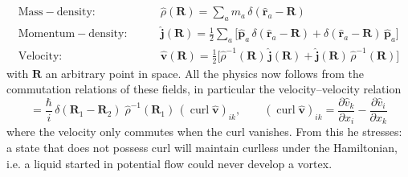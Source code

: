 \begin{equation}
\begin{aligned}
    \mathrm{Mass-density:} \qquad &\hat\rho(\mathbf R)=\sum_a m_a\,\delta(\hat{\mathbf r}_a-\mathbf R) \\
    \mathrm{Momentum-density:}\qquad &\hat{\mathbf j}(\mathbf R)=\frac{1}{2}\sum_a\big[\hat{\mathbf p}_a\,\delta(\hat{\mathbf r}_a-\mathbf R)+\delta(\hat{\mathbf r}_a-\mathbf R)\,\hat{\mathbf p}_a\big]\\
    \mathrm{Velocity:} \qquad &\hat{\mathbf v}(\mathbf R)=\frac{1}{2}\big[\hat\rho^{-1}(\mathbf R)\,\hat{\mathbf j}(\mathbf R)+\hat{\mathbf j}(\mathbf R)\,\hat\rho^{-1}(\mathbf R)\big]
\end{aligned}
\end{equation}
with $\mathbf R$ an arbitrary point in space. All the physics now follows from the commutation relations of these fields, in particular the velocity–velocity relation
\begin{equation}
    [\hat v_i(\mathbf R_1),\hat v_k(\mathbf R_2)] = \frac{\hbar}{i}\,\delta(\mathbf R_1-\mathbf R_2)\;\hat\rho^{-1}(\mathbf R_1)\,(\operatorname{curl}\hat{\mathbf v})_{ik},
\qquad (\operatorname{curl}\hat{\mathbf v})_{ik}=\frac{\partial \hat v_k}{\partial x_i}-\frac{\partial \hat v_i}{\partial x_k}
\end{equation}
where the velocity only commutes when the curl vanishes. From this he stresses: a state that does not possess curl will maintain curlless under the Hamiltonian, i.e. a liquid started in potential flow could never develop a vortex.


